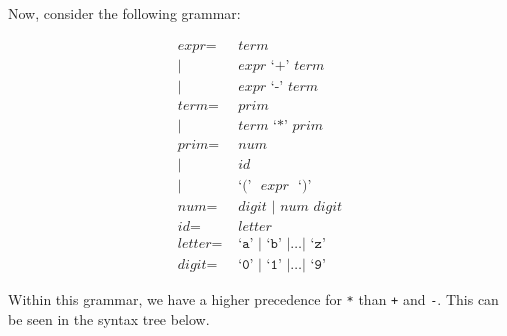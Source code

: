 \documentclass[a4paper, openany]{memoir}
\begin{document}
Now, consider the following grammar:
\begin{figure}[H]
    \centering
    \begin{align*}
        \textit{expr} =& \textit{  term} \\
        |\hspace{2pt} & \textit{ expr } \text{`}\texttt{+}\text{'} \textit{ term} \\
        |\hspace{2pt} & \textit{ expr } \text{`}\texttt{-}\text{'} \textit{ term} \\
        \textit{term} =& \textit{ prim} \\
        |\hspace{2pt} & \textit{ term } \text{`}\texttt{*}\text{'} \textit{ prim} \\
        \textit{prim} =& \textit{ num} \\
        |\hspace{2pt} & \textit{ id} \\
        |\hspace{2pt} & \text{ `}\texttt{(}\text{' } \textit{ expr } \text{ `}\texttt{)}\text{'} \\
        \textit{num} =& \textit{ digit } | \textit{ num digit} \\
        \textit{id} =& \textit{ letter} \\
        \textit{letter} =& \text{ `}\texttt{a}\text{' } | \text{ `}\texttt{b}\text{' } | \dots | \text{ `}\texttt{z}\text{' } \\
        \textit{digit} =& \text{ `}\texttt{0}\text{' } | \text{ `}\texttt{1}\text{' } | \dots | \text{ `}\texttt{9}\text{'} 
    \end{align*}
\end{figure}
\noindent Within this grammar, we have a higher precedence for \texttt{*} than \texttt{+} and \texttt{-}. This can be seen in the syntax tree below.
\end{document}
